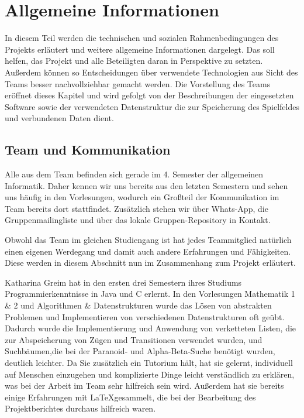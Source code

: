 \documentclass[12pt,a4paper,bibliography=totocnumbered,listof=totocnumbered]{scrartcl}
\begin{document}
    \section{Allgemeine Informationen}
    \vspace{1em}

    In diesem Teil werden die technischen und sozialen Rahmenbedingungen des Projekts erläutert und weitere allgemeine Informationen dargelegt. Das soll helfen, das Projekt und alle Beteiligten daran in Perspektive zu setzten. Außerdem können so Entscheidungen über verwendete Technologien aus Sicht des Teams besser nachvollziehbar gemacht werden. Die Vorstellung des Teams eröffnet dieses Kapitel und wird gefolgt von der Beschreibungen der eingesetzten Software sowie der verwendeten Datenstruktur die zur Speicherung des Spielfeldes und verbundenen Daten dient.

    \subsection{Team und Kommunikation}
    \vspace{1em}
    Alle aus dem Team befinden sich gerade im 4. Semester der allgemeinen Informatik. Daher kennen wir uns bereits aus den letzten Semestern und sehen uns häufig in den Vorlesungen, wodurch ein Großteil der Kommunikation im Team bereits dort stattfindet. Zusätzlich stehen wir über Whats-App, die Gruppenmailingliste und über das lokale Gruppen-Repository in Kontakt.

    Obwohl das Team im gleichen Studiengang ist hat jedes Teammitglied natürlich einen eigenen Werdegang und damit auch andere Erfahrungen und Fähigkeiten. Diese werden in diesem Abschnitt nun im Zusammenhang zum Projekt erläutert.

    Katharina Greim hat in den ersten drei Semestern ihres Studiums Programmierkenntnisse in Java und C erlernt. In den Vorlesungen Mathematik 1 \& 2 und Algorithmen \& Datenstrukturen wurde das Lösen von abstrakten Problemen und Implementieren von verschiedenen Datenstrukturen oft geübt. Dadurch wurde die Implementierung und Anwendung von verketteten Listen, die zur Abspeicherung von Zügen und Transitionen verwendet wurden, und Suchbäumen,die bei der Paranoid- und Alpha-Beta-Suche benötigt wurden, deutlich leichter. Da Sie zusätzlich ein Tutorium hält, hat sie gelernt, individuell auf Menschen einzugehen und komplizierte Dinge leicht verständlich zu erklären, was bei der Arbeit im Team sehr hilfreich sein wird. Außerdem hat sie bereits einige Erfahrungen mit \LaTeX\quad gesammelt, die bei der Bearbeitung des Projektberichtes durchaus hilfreich waren.
\end{document}
